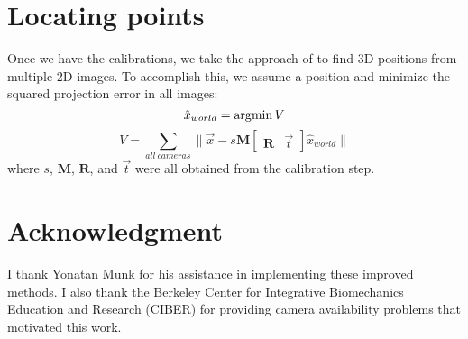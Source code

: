 \section{Locating points}
Once we have the calibrations, we take the approach of \cite{Munk:2011} to find 3D positions from multiple 2D images.  To accomplish this, we assume a position and minimize the squared projection error in all images:
\begin{equation}
\hat{x}_{world} = 
\operatorname*{\arg\!\min} V
\end{equation}
\begin{equation}
V =
\sum_{all\ cameras} 
\| \vec{x} - s \mathbf{M} 
\begin{bmatrix}
\mathbf{R} & \vec{t}
\end{bmatrix}
\hat{x}_{world}
\|
\end{equation}
where $s$, $\mathbf{M}$, $\mathbf{R}$, and $\vec{t}$ were all obtained from the calibration step. 


\section*{Acknowledgment}
I thank Yonatan Munk for his assistance in implementing these improved methods.  I also thank the Berkeley Center for Integrative Biomechanics Education and Research (CIBER) for providing camera availability problems that motivated this work.  


